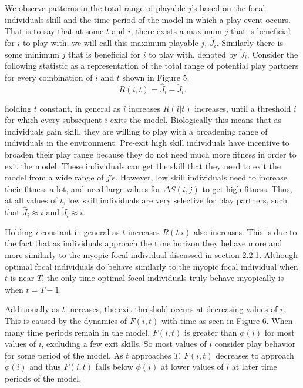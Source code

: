 \documentclass[12pt, letterpaper, fleqn]{article}
\begin{document}
      We observe patterns in the total range of playable $j$'s based on the focal individuals skill and the time period of the model in which a play event occurs. %
      That is to say that at some $t$ and $i$, there exists a maximum $j$ that is beneficial for $i$ to play with; we will call this maximum playable $j$, $\hat J_{i}$.
      Similarly there is some minimum $j$ that is beneficial for $i$ to play with, denoted by $\check J_{i}$.
      Consider the following statistic as a representation of the total range of potential play partners for every combination of $i$ and $t$ shown in Figure 5.
      \begin{equation}
      R(i,t)=\hat J_i - \check J_{i}.
      \end{equation}
      
      holding $t$ constant, in general as $i$ increases $R(i|t)$ increases, until a threshold $i$ for which every subsequent $i$ exits the model.
      Biologically this means that as individuals gain skill, they are willing to play with a broadening range of individuals in the environment.
      Pre-exit high skill individuals have incentive to broaden their play range because they do not need much more fitness in order to exit the model.
      These individuals can get the skill that they need to exit the model from a wide range of $j$'s.
      However, low skill individuals need to increase their fitness a lot, and need large values for $\Delta S(i,j)$ to get high fitness.
      Thus, at all values of $t$, low skill individuals are very selective for play partners, such that $\hat J_i \approx i$ and $\check J_i \approx i$. 
      
      Holding $i$ constant in general as $t$ increases $R(t|i)$ also increases.
      This is due to the fact that as individuals approach the time horizon they behave more and more similarly to the myopic focal individual discussed in section 2.2.1. %
      Although optimal focal individuals do behave similarly to the myopic focal individual when $t$ is near $T$, the only time optimal focal individuals truly behave myopically is when $t=T-1$.   

      Additionally as $t$ increases, the exit threshold occurs at decreasing values of $i$. %
      This is caused by the dynamics of $F(i,t)$ with time as seen in Figure 6.
      When many time periods remain in the model, $F(i,t)$ is greater than $\phi(i)$ for most values of $i$, excluding a few exit skills.
      So most values of $i$ consider play behavior for some period of the model.
      As $t$ approaches $T$, $F(i,t)$ decreases to approach $\phi(i)$ and thus $F(i,t)$ falls below $\phi(i)$ at lower values of $i$ at later time periods of the model. 
         
\end{document}
